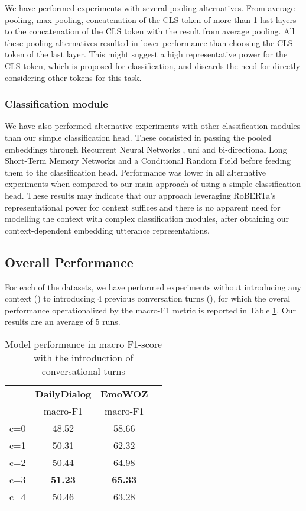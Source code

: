 \documentclass[11pt]{article}
\begin{document}
We have performed experiments with several pooling alternatives. From average pooling, max pooling, concatenation of the CLS token of more than 1 last layers to the concatenation of the CLS token with the result from average pooling. All these pooling alternatives resulted in lower performance than choosing the CLS token of the last layer. This might suggest a high representative power for the CLS token, which is proposed for classification, and discards the need for directly considering other tokens for this task.
\vspace{2.5mm}
\subsubsection{Classification module}

We have also performed alternative experiments with other classification modules than our simple classification head. These consisted in passing the pooled embeddings through Recurrent Neural Networks \cite{elman1991distributed}, uni \cite{hochreiter1997long} and bi-directional \cite{graves2005bidirectional} Long Short-Term Memory Networks and a Conditional Random Field  \cite{lafferty2001conditional} before feeding them to the classification head. Performance was lower in all alternative experiments when compared to our main approach of using a simple classification head. These results may indicate that our approach leveraging RoBERTa's representational power for context suffices and there is no apparent need for modelling the context with complex classification modules, after obtaining our context-dependent embedding utterance representations. 




\subsection{Overall Performance}

For each of the datasets, we have performed experiments without introducing any context () to introducing 4 previous conversation turns (), for which the overal performance operationalized by the macro-F1 metric is reported in Table \ref{t2}. Our results are an average of 5 runs.

\begin{table}[H]
 \centering
 \caption{Model performance in macro F1-score with the introduction of  conversational turns}
  \begin{tabular}{cccc}
    \hline
       &\textbf{DailyDialog} & \textbf{EmoWOZ}\\
      &   macro-F1 & macro-F1\\
    \hline
    c=0&48.52&58.66\\
    c=1 &50.31&62.32\\
    c=2  & 50.44&64.98 \\
    c=3 &  \textbf{51.23}&\textbf{65.33}\\
    c=4& 50.46&63.28\\
    
    \hline
  \end{tabular} 
 \label{t2}
\end{table}
\end{document}
